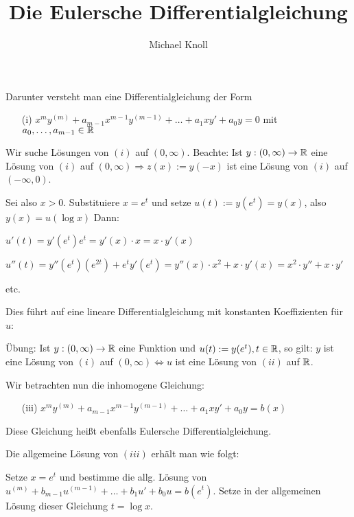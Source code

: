 \documentclass{article}
\title{Die Eulersche Differentialgleichung}
\author{Michael Knoll}
\begin{document}
\maketitle



Darunter versteht man eine Differentialgleichung der Form

\begin{itemize}
	\item [(i)] $x^m y^{(m)} + a_{m-1} x^{m-1} y^{(m-1)} + \dots + a_1 x y' + a_0 y = 0$ mit $a_0, \dots, a_{m-1} \in \mathbb{R}$
\end{itemize}

Wir suche Lösungen von $(i)$ auf $(0, \infty)$. Beachte: Ist $y: (0, \infty) \to \mathbb{R}$ eine Lösung von $(i)$ auf $(0, \infty) \Rightarrow z(x) := y(-x)$ ist eine Lösung von $(i)$ auf $(-\infty, 0)$.


\begin{satz}[Lösungsansatz] %
	Sei also $x>0$. Substituiere $x = e^t$ und setze $u(t):=y(e^t) = y(x)$, also $y(x) = u( \log x)$
	Dann: 
	
	$u'(t) = y'(e^t)e^t = y'(x) \cdot x = x \cdot y'(x)$
	
	$u''(t) = y''(e^t)(e^{2t}) + e^t y'(e^t) = y''(x) \cdot x^2 + x \cdot y'(x) = x^2 \cdot y'' + x \cdot y'$
	
	etc. 
	
	Dies führt auf eine lineare Differentialgleichung mit konstanten Koeffizienten für $u$:
	
	Übung: Ist $y: (0,\infty) \to \mathbb{R}$ eine Funktion und $u(t):=y(e^t), t \in \mathbb{R}$, so gilt: $y$ ist eine Lösung von $(i)$ auf $(0, \infty) \Leftrightarrow u$ ist eine Lösung von $(ii)$ auf $\mathbb{R}$.
	
	Wir betrachten nun die inhomogene Gleichung:
	
\begin{itemize}
	\item [(iii)] $x^m y^{(m)} + a_{m-1} x^{m-1} y^{(m-1)} + \dots + a_1 x y' + a_0 y = b(x)$
\end{itemize}
	Diese Gleichung heißt ebenfalls Eulersche Differentialgleichung.
	
	Die allgemeine Lösung von $(iii)$ erhält man wie folgt:
	
	Setze $x= e^t$ und bestimme die allg. Lösung von $u^{(m)} + b_{m-1}u^{(m-1)} + \dots + b_1 u' + b_0 u = b(e^t)$. Setze in der allgemeinen Lösung dieser Gleichung $t = \log x.$
\end{satz}	
\end{document}
